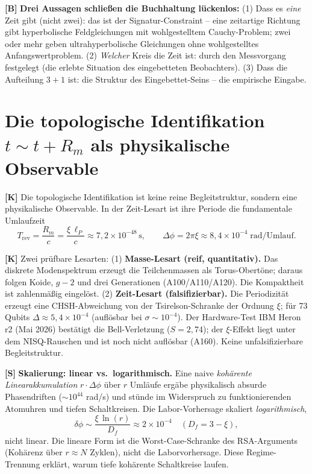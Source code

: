 \textbf{[B]} \textbf{Drei Aussagen schließen die Buchhaltung lückenlos:} (1) Dass
es \emph{eine} Zeit gibt (nicht zwei): das ist der Signatur-Constraint -- eine
zeitartige Richtung gibt hyperbolische Feldgleichungen mit wohlgestelltem
Cauchy-Problem; zwei oder mehr geben ultrahyperbolische Gleichungen ohne
wohlgestelltes Anfangswertproblem. (2) \emph{Welcher} Kreis die Zeit ist: durch
den Messvorgang festgelegt (die erlebte Situation des eingebetteten Beobachters).
(3) Dass die Aufteilung $3+1$ ist: die Struktur des Eingebettet-Seins -- die
empirische Eingabe.

\section{Die topologische Identifikation $t\sim t+R_m$ als physikalische Observable}

\textbf{[K]} Die topologische Identifikation ist keine reine Begleitstruktur,
sondern eine physikalische Observable. In der Zeit-Lesart ist ihre Periode die
fundamentale Umlaufzeit
\[
  T_\text{rev} = \frac{R_m}{c} = \frac{\xi\,\ell_P}{c}\approx 7{,}2\times10^{-48}\,\text{s},
  \qquad \Delta\phi = 2\pi\xi\approx 8{,}4\times10^{-4}\;\text{rad/Umlauf}.
\]

\textbf{[K]} Zwei prüfbare Lesarten: (1) \textbf{Masse-Lesart (reif,
quantitativ).} Das diskrete Modenspektrum erzeugt die Teilchenmassen als
Torus-Obertöne; daraus folgen Koide, $g-2$ und drei Generationen (A100/A110/A120).
Die Kompaktheit ist zahlenmäßig eingelöst. (2) \textbf{Zeit-Lesart
(falsifizierbar).} Die Periodizität erzeugt eine CHSH-Abweichung von der
Tsirelson-Schranke der Ordnung $\xi$; für 73 Qubits $\Delta\approx5{,}4\times10^{-4}$
(auflösbar bei $\sigma\sim10^{-4}$). Der Hardware-Test IBM Heron r2 (Mai 2026)
bestätigt die Bell-Verletzung ($S=2{,}74$); der $\xi$-Effekt liegt unter dem
NISQ-Rauschen und ist noch nicht auflösbar (A160). Keine unfalsifizierbare
Begleitstruktur.

\textbf{[S]} \textbf{Skalierung: linear vs.\ logarithmisch.} Eine naive
\emph{kohärente Linearakkumulation} $r\cdot\Delta\phi$ über $r$ Umläufe ergäbe
physikalisch absurde Phasendriften ($\sim10^{44}$ rad/s) und stünde im Widerspruch
zu funktionierenden Atomuhren und tiefen Schaltkreisen. Die Labor-Vorhersage
skaliert \emph{logarithmisch},
\[
  \delta\phi\sim\frac{\xi\,\ln(r)}{D_f}\approx2\times10^{-4}
  \quad (D_f=3-\xi),
\]
nicht linear. Die lineare Form ist die Worst-Case-Schranke des RSA-Arguments
(Kohärenz über $r\approx N$ Zyklen), nicht die Laborvorhersage. Diese
Regime-Trennung erklärt, warum tiefe kohärente Schaltkreise laufen.

